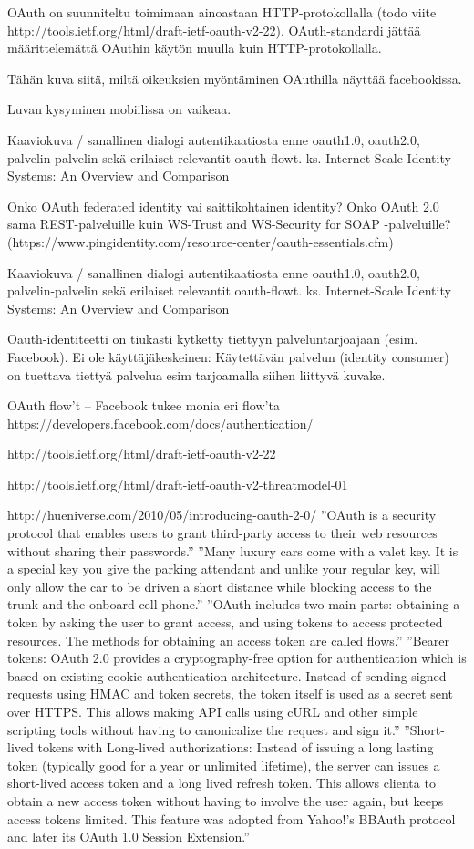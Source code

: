 \documentclass[english,gradu]{tktltiki}
\begin{document}
  OAuth on suunniteltu toimimaan ainoastaan HTTP-protokollalla (todo viite http://tools.ietf.org/html/draft-ietf-oauth-v2-22).
  OAuth-standardi jättää määrittelemättä OAuthin käytön muulla kuin HTTP-protokollalla.

  Tähän kuva siitä, miltä oikeuksien myöntäminen OAuthilla näyttää facebookissa.

  Luvan kysyminen mobiilissa on vaikeaa.

  Kaaviokuva / sanallinen dialogi autentikaatiosta enne oauth1.0, oauth2.0, palvelin-palvelin sekä erilaiset relevantit oauth-flowt.
  ks. Internet-Scale Identity Systems: An Overview and Comparison

  Onko OAuth federated identity vai saittikohtainen identity?
  Onko OAuth 2.0 sama REST-palveluille kuin WS-Trust and WS-Security for SOAP -palveluille? (https://www.pingidentity.com/resource-center/oauth-essentials.cfm)

  Kaaviokuva / sanallinen dialogi autentikaatiosta enne oauth1.0, oauth2.0, palvelin-palvelin sekä erilaiset relevantit oauth-flowt.
  ks. Internet-Scale Identity Systems: An Overview and Comparison

  Oauth-identiteetti on tiukasti kytketty tiettyyn palveluntarjoajaan (esim. Facebook).
  Ei ole käyttäjäkeskeinen: Käytettävän palvelun (identity consumer) on tuettava tiettyä palvelua esim tarjoamalla siihen liittyvä kuvake.

  OAuth flow't -- Facebook tukee monia eri flow'ta https://developers.facebook.com/docs/authentication/

  http://tools.ietf.org/html/draft-ietf-oauth-v2-22

  http://tools.ietf.org/html/draft-ietf-oauth-v2-threatmodel-01

  http://hueniverse.com/2010/05/introducing-oauth-2-0/
  ''OAuth is a security protocol that enables users to grant third-party access to their web resources without sharing their passwords.''
  ''Many luxury cars come with a valet key. It is a special key you give the parking attendant and unlike your regular key, will only allow the car to be driven a short distance while blocking access to the trunk and the onboard cell phone.''
  ''OAuth includes two main parts: obtaining a token by asking the user to grant access, and using tokens to access protected resources. The methods for obtaining an access token are called flows.''
  ''Bearer tokens: OAuth 2.0 provides a cryptography-free option for authentication which is based on existing cookie authentication architecture. Instead of sending signed requests using HMAC and token secrets, the token itself is used as a secret sent over HTTPS. This allows making API calls using cURL and other simple scripting tools without having to canonicalize the request and sign it.''
  ''Short-lived tokens with Long-lived authorizations: Instead of issuing a long lasting token (typically good for a year or unlimited lifetime), the server can issues a short-lived access token and a long lived refresh token. This allows clienta to obtain a new access token without having to involve the user again, but keeps access tokens limited. This feature was adopted from Yahoo!’s BBAuth protocol and later its OAuth 1.0 Session Extension.''
\end{document}
